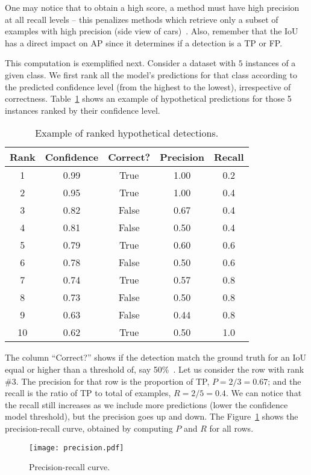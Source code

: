 One may notice that to obtain a high score, a method must have high precision at all recall levels -- this penalizes methods which retrieve only a subset of examples with high precision (\eg side view of cars)~\cite{Everingham10}.
Also, remember that the IoU has a direct impact on AP since it determines if a detection is a TP or FP.

This computation is exemplified next.
Consider a dataset with $5$ instances of a given class.
We first rank all the model's predictions for that class according to the predicted confidence level (from the highest to the lowest), irrespective of correctness.
Table~\ref{tab:ex_rank_detections} shows an example of hypothetical predictions for those 5 instances ranked by their confidence level.
%
\begin{table}[th]
\centering
\caption{Example of ranked hypothetical detections.}
\label{tab:ex_rank_detections}
\begin{tabular}{ccccc}
\toprule
Rank &  Confidence &  Correct? &  Precision &  Recall \\
\midrule
1 &    0.99 &      True &   1.00 &     0.2 \\
2 &    0.95 &      True &   1.00 &     0.4 \\
3 &    0.82 &     False &   0.67 &     0.4 \\
4 &    0.81 &     False &   0.50 &     0.4 \\
5 &    0.79 &      True &   0.60 &     0.6 \\
6 &    0.78 &     False &   0.50 &     0.6 \\
7 &    0.74 &      True &   0.57 &     0.8 \\
8 &    0.73 &     False &   0.50 &     0.8 \\
9 &    0.63 &     False &   0.44 &     0.8 \\
10 &   0.62 &      True &   0.50 &     1.0 \\
\bottomrule
\end{tabular}
\end{table}
%
The column ``Correct?'' shows if the detection match the ground truth for an IoU equal or higher than a threshold of, say 50\%~\cite{Everingham10}.
%
Let us consider the row with rank \#3.
The precision for that row is the proportion of TP, $P=2/3=0.67$;
and the recall is the ratio of TP to total of examples, $R = 2/5 = 0.4$.
We can notice that the recall still increases as we include more predictions (lower the confidence model threshold), but the precision goes up and down.
The Figure~\ref{fig:prec-rec_curve} shows the precision-recall curve, obtained by computing $P$ and $R$ for all rows.
%
\begin{figure}[th]
	\centering
	\texttt{[image: precision.pdf]}
	\caption{Precision-recall curve.}
	\label{fig:prec-rec_curve}
\end{figure}


